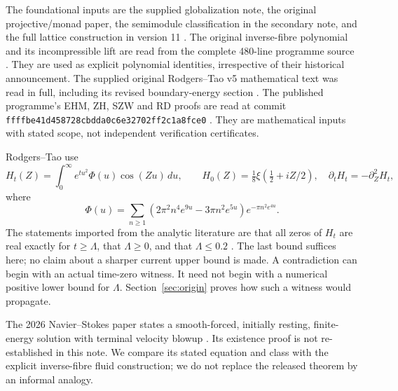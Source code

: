 \documentclass[11pt,a4paper]{article}
\theoremstyle{definition}\newtheorem{definition}[theorem]{Definition}\newtheorem{remark}[theorem]{Remark}
\begin{document}
The foundational inputs are the supplied globalization note, the original projective/monad paper, the semimodule classification in the secondary note, and the full lattice construction in version 11 \cite{Globalization,P1,Secondary,V11}. The original inverse-fibre polynomial and its incompressible lift are read from the complete 480-line programme source \cite{IFH}. They are used as explicit polynomial identities, irrespective of their historical announcement. The supplied original Rodgers--Tao v5 mathematical text was read in full, including its revised boundary-energy section \cite{RT}. The published programme's EHM, ZH, SZW and RD proofs are read at commit \texttt{ffffbe41d458728cbdda0c6e32702ff2c1a8fce0} \cite{EHM,ZH,SZW,RD}. They are mathematical inputs with stated scope, not independent verification certificates.

Rodgers--Tao use
\begin{equation}
 H_t(Z)=\int_0^\infty e^{tu^2}\Phi(u)\cos(Zu)\,du,
 \qquad H_0(Z)=\tfrac18\xi(\tfrac12+iZ/2),
 \quad \partial_tH_t=-\partial_Z^2H_t,                 \label{eq:rt}
\end{equation}
where
\begin{equation}
 \Phi(u)=\sum_{n\ge1}(2\pi^2n^4e^{9u}-3\pi n^2e^{5u})e^{-\pi n^2e^{4u}}.
                                                        \label{eq:phi}
\end{equation}
The statements imported from the analytic literature are that all zeros of $H_t$ are real exactly for $t\ge\Lambda$, that $\Lambda\ge0$, and that $\Lambda\le0.2$ \cite{RT,PT}. The last bound suffices here; no claim about a sharper current upper bound is made. A contradiction can begin with an actual time-zero witness. It need not begin with a numerical positive lower bound for $\Lambda$. Section~\ref{sec:origin} proves how such a witness would propagate.

The 2026 Navier--Stokes paper states a smooth-forced, initially resting, finite-energy solution with terminal velocity blowup \cite{NS}. Its existence proof is not re-established in this note. We compare its stated equation and class with the explicit inverse-fibre fluid construction; we do not replace the released theorem by an informal analogy.
\end{document}
